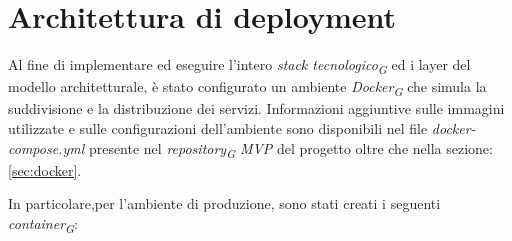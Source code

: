 \section{Architettura di deployment}

Al fine di implementare ed eseguire l'intero \textit{stack tecnologico}\textsubscript{\textit{G}} ed i layer del modello architetturale, è stato configurato un ambiente \textit{Docker}\textsubscript{\textit{G}} che simula la suddivisione e la distribuzione dei servizi.
Informazioni aggiuntive sulle immagini utilizzate e sulle configurazioni dell'ambiente sono disponibili nel file \textit{docker-compose.yml} presente nel \textit{repository}\textsubscript{\textit{G}} \textit{MVP} del progetto oltre che nella sezione: \ref{sec:docker}.

In particolare,per l'ambiente di produzione, sono stati creati i seguenti \textit{container}\textsubscript{\textit{G}}:
